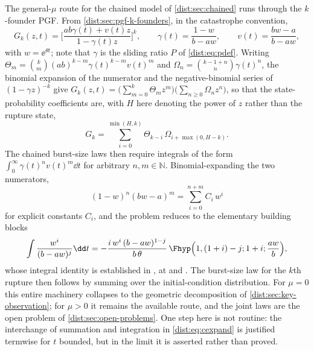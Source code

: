 The general-$\mu$ route for the chained model of \cref{dist:sec:chained} runs
through the $k$-founder PGF. From \cref{dist:sec:pgf-k-founders}, in the
catastrophe convention,
\begin{equation}
G_k(z,t)=\Biggl[\frac{ab\gamma(t)+v(t)z}{1-\gamma(t)z}\Biggr]^k,
\qquad
\gamma(t)=\frac{1-w}{b-aw},
\qquad
v(t)=\frac{bw-a}{b-aw},
\label{dist:eq:gkgamma}
\end{equation}
with $w=\ee^{\theta t}$; note that $\gamma$ is the sliding ratio $P$ of
\cref{dist:eq:pdef}. Writing
$\Theta_m=\binom{k}{m}(ab)^{k-m}\gamma(t)^{k-m}v(t)^m$ and
$\Omega_n=\binom{k-1+n}{n}\gamma(t)^n$, the binomial expansion of the
numerator and the negative-binomial series of $(1-\gamma z)^{-k}$ give
$G_k(z,t)=\bigl(\sum_{m=0}^k\Theta_m z^m\bigr)\bigl(\sum_{n\ge0}\Omega_n
z^n\bigr)$, so that the state-probability coefficients are, with $H$ here
denoting the power of $z$ rather than the rupture state,
\begin{equation}
[z^H]G_k=
\sum_{i=0}^{\min(H,k)}
\Theta_{k-i}\,\Omega_{i+\max(0,H-k)}.
\label{dist:eq:zHGk}
\end{equation}
The chained burst-size laws then require integrals of the form
$\int_0^\infty\gamma(t)^n v(t)^m\dd t$ for arbitrary $n,m\in\mathbb{N}$.
Binomial-expanding the two numerators,
\begin{equation}
(1-w)^n(bw-a)^m=\sum_{i=0}^{n+m}C_i\,w^{i}
\label{dist:eq:cexpand}
\end{equation}
for explicit constants $C_i$, and the problem reduces to the elementary
building blocks
\begin{equation}
\int\frac{w^{i}}{(b-aw)^j}\dd t
=-\frac{i\,w^{i}\,(b-aw)^{1-j}}{b\,\theta}\,
\Fhyp\Bigl(1,(1+i)-j;1+i;\frac{aw}{b}\Bigr),
\label{dist:eq:hypantideriv}
\end{equation}
whose integral identity is established in
, at
 and
. The burst-size law for the
$k$th rupture then follows by summing over the initial-condition
distribution. For $\mu=0$ this entire machinery collapses to the geometric
decomposition of \cref{dist:sec:key-observation}; for $\mu>0$ it remains the
available route, and the joint laws are the open problem of
\cref{dist:sec:open-problems}. One step here is not routine: the interchange
of summation and integration in \cref{dist:eq:cexpand} is justified termwise
for $t$ bounded, but in the limit it is asserted rather than proved.


